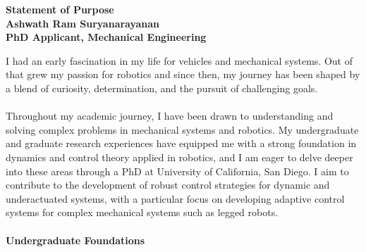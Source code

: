 \documentclass[10pt]{article}
\begin{document}
\begin{center}
    {\LARGE \textbf{Statement of Purpose}} \\[1em] %
    {\large \textbf{Ashwath Ram Suryanarayanan}} \\[1em] %
    {\normalsize \textbf{PhD Applicant, Mechanical Engineering}} \\[1em] %
\end{center}

\noindent I had an early fascination in my life for vehicles and mechanical systems. Out of that grew my passion for robotics and since then, my journey has been shaped by a blend of curiosity, determination, and the pursuit of challenging goals. \\ \\ Throughout my academic journey, I have been drawn to understanding and solving complex problems in mechanical systems and robotics. My undergraduate and graduate research experiences have equipped me with a strong foundation in dynamics and control theory applied in robotics, and I am eager to delve deeper into these areas through a PhD at University of California, San Diego. I aim to contribute to the development of robust control strategies for dynamic and underactuated systems, with a particular focus on developing adaptive control systems for complex mechanical systems such as legged robots. \\ \\
\textbf{Undergraduate Foundations}\\ 
\end{document}
